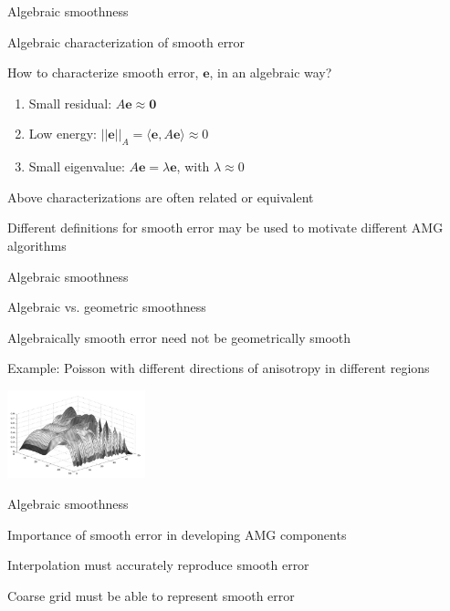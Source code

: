 \documentclass[18pt,xcolor=table]{beamer}
\begin{document}
\begin{frame}{Algebraic smoothness}
\begin{block}{Algebraic characterization of smooth error}
\bit
\item How to characterize smooth error, $\mathbf{e}$, in an algebraic way?
\begin{enumerate}
   \item Small residual: $A\mathbf{e} \approx \mathbf{0}$
   \item Low energy: $||\mathbf{e}||_A = \langle \mathbf{e}, A\mathbf{e} \rangle \approx 0$
   \item Small eigenvalue: $A\mathbf{e} = \lambda\mathbf{e}$, with $\lambda \approx 0$
\end{enumerate}
\item Above characterizations are often related or equivalent
\item Different definitions for smooth error may be used to motivate different AMG algorithms
\eit
\end{block}
\end{frame}

\begin{frame}{Algebraic smoothness}
\begin{block}{Algebraic vs. geometric smoothness}
\bit
\item Algebraically smooth error need not be geometrically smooth
\item Example: Poisson with different directions of anisotropy in different regions
\eit
\end{block}
\begin{center}
\includegraphics[width=0.3\textwidth]{../figures/algebraicallySmooth}
\end{center}
\end{frame}

\begin{frame}{Algebraic smoothness}
\begin{block}{Importance of smooth error in developing AMG components}
\bit
\item Interpolation must accurately reproduce smooth error
\item Coarse grid must be able to represent smooth error
\eit
\end{block}
\end{frame}
\end{document}
